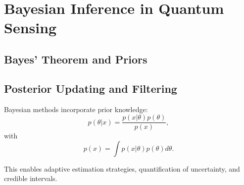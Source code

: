 \chapter{Bayesian Inference in Quantum Sensing}
\section{Bayes' Theorem and Priors}
\section{Posterior Updating and Filtering}

Bayesian methods incorporate prior knowledge:
\[
p(\theta|x) = \frac{p(x|\theta) p(\theta)}{p(x)},
\]
with
\[
p(x) = \int p(x|\theta) p(\theta) d\theta.
\]

This enables adaptive estimation strategies, quantification of
uncertainty, and credible intervals.
